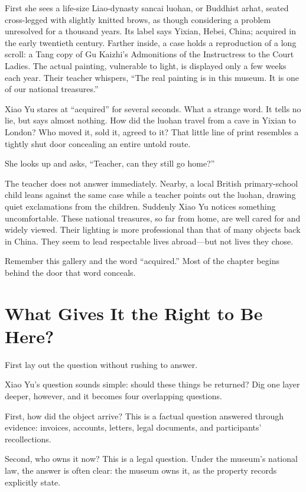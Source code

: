 First she sees a life-size Liao-dynasty sancai luohan, or Buddhist arhat, seated cross-legged with slightly knitted brows, as though considering a problem unresolved for a thousand years. Its label says Yixian, Hebei, China; acquired in the early twentieth century. Farther inside, a case holds a reproduction of a long scroll: a Tang copy of Gu Kaizhi's Admonitions of the Instructress to the Court Ladies. The actual painting, vulnerable to light, is displayed only a few weeks each year. Their teacher whispers, ``The real painting is in this museum. It is one of our national treasures.''

Xiao Yu stares at ``acquired'' for several seconds. What a strange word. It tells no lie, but says almost nothing. How did the luohan travel from a cave in Yixian to London? Who moved it, sold it, agreed to it? That little line of print resembles a tightly shut door concealing an entire untold route.

She looks up and asks, ``Teacher, can they still go home?''

The teacher does not answer immediately. Nearby, a local British primary-school child leans against the same case while a teacher points out the luohan, drawing quiet exclamations from the children. Suddenly Xiao Yu notices something uncomfortable. These national treasures, so far from home, are well cared for and widely viewed. Their lighting is more professional than that of many objects back in China. They seem to lead respectable lives abroad---but not lives they chose.

Remember this gallery and the word ``acquired.'' Most of the chapter begins behind the door that word conceals.

\section{What Gives It the Right to Be Here?}
First lay out the question without rushing to answer.

Xiao Yu's question sounds simple: should these things be returned? Dig one layer deeper, however, and it becomes four overlapping questions.

First, how did the object arrive? This is a factual question answered through evidence: invoices, accounts, letters, legal documents, and participants' recollections.

Second, who owns it now? This is a legal question. Under the museum's national law, the answer is often clear: the museum owns it, as the property records explicitly state.


